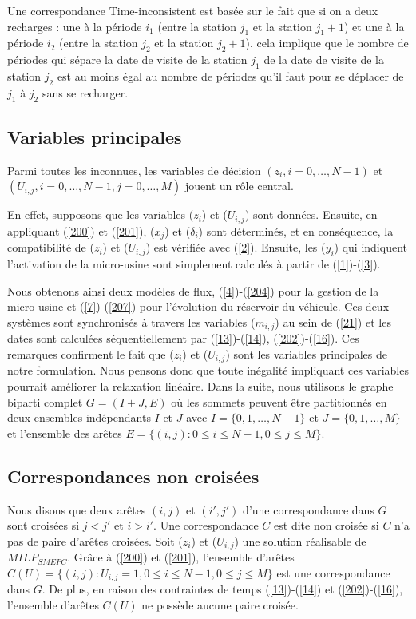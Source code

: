 {{Une correspondance Time-inconsistent est basée sur le fait que si on a deux recharges : une à la période $i_1$ (entre la station $j_1$ et la station $j_1+1$) et une à la période $i_2$ (entre la station $j_2$ et la station $j_2+1$).  cela implique que le nombre de périodes qui sépare la date de visite de la station $j_1$ de la date de visite de la station $j_2$ est au moins égal au nombre de périodes qu'il faut pour se déplacer de $j_1$ à $j_2$ sans se recharger.

\subsection{Variables principales}
Parmi toutes les inconnues, les variables de décision $(z_i, i=0, \dots, N-1)$ et $(U_{i,j}, i=0, \dots, N-1, j=0, \dots, M)$ jouent un rôle central.

En effet, supposons que les variables ($z_i$) et ($U_{i,j}$) sont données.
 Ensuite, en appliquant (\ref{200}) et (\ref{201}), ($x_j$) et ($\delta_i$) sont déterminés, et en conséquence, la compatibilité de ($z_i$) et ($U_{i,j}$) est vérifiée avec (\ref{2}). Ensuite, les ($y_i$) qui indiquent l'activation de la micro-usine sont simplement calculés à partir de (\ref{1})-(\ref{3}).

Nous obtenons ainsi deux modèles de flux, (\ref{4})-(\ref{204}) pour la gestion de la micro-usine et (\ref{7})-(\ref{207}) pour l'évolution du réservoir du véhicule. Ces deux systèmes sont synchronisés à travers les variables ($m_{i,j}$) au sein de
(\ref{21}) et les dates sont calculées séquentiellement par (\ref{13})-(\ref{14}), (\ref{202})-(\ref{16}).
Ces remarques confirment le fait que ($z_i$) et ($U_{i,j}$) sont les variables principales de notre formulation.
Nous pensons donc que toute inégalité impliquant ces variables pourrait améliorer la relaxation linéaire.
Dans la suite, nous utilisons le graphe biparti complet $G = (I+J, E)$ où les sommets peuvent être partitionnés en deux ensembles indépendants $I$ et $J$ avec $I = \{0, 1, \dots, N-1\}$ et $J = \{0, 1, \dots, M\}$ et l'ensemble des arêtes $E = \{(i, j) : 0 \leq i \leq N-1, 0 \leq j \leq M\}$.

\subsection{Correspondances non croisées}\label{Non_crossing_matchings}

Nous disons que deux arêtes $(i, j)$ et $(i', j')$ d'une correspondance dans $G$ sont croisées si $j < j'$ et $i > i'$. Une correspondance $C$ est dite non croisée si $C$ n'a pas de paire d'arêtes croisées.
Soit ($z_i$) et ($U_{i, j}$) une solution réalisable de $MILP_{SMEPC}$. Grâce à (\ref{200}) et (\ref{201}), l'ensemble d'arêtes $C(U) = \{(i, j) : U_{i,j} = 1, 0 \leq i \leq N-1, 0 \leq j \leq M\}$ est une correspondance dans $G$. De plus, en raison des contraintes de temps (\ref{13})-(\ref{14}) et (\ref{202})-(\ref{16}), l'ensemble d'arêtes $C(U)$ ne possède aucune paire croisée. 

}}
